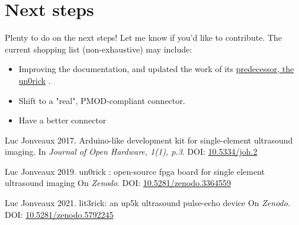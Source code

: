 \documentclass{article}
\begin{document}
 \section{Next steps}

Plenty to do on the next steps! Let me know if you'd like to contribute. The current shopping list (non-exhaustive) may include:

\begin{itemize}
\item Improving the documentation, and updated the work of its \href{https://github.com/kelu124/un0rick}{predecessor, the un0rick} \cite{un0rick}.
\item Shift to a "real", PMOD-compliant connector.
\item Have a better connector
\end{itemize}


  


\begin{thebibliography}{1}

  Luc Jonveaux 2017.
  \newblock  Arduino-like development kit for single-element ultrasound imaging. 
  \newblock In {\em  Journal of Open Hardware, 1(1), p.3}. DOI: \href{http://doi.org/10.5334/joh.2}{10.5334/joh.2}
  
  Luc Jonveaux 2019.
  \newblock  un0rick : open-source fpga board for single element ultrasound imaging
  \newblock On {\em  Zenodo}. DOI: \href{http://doi.org/10.5281/zenodo.3364559}{10.5281/zenodo.3364559}
  
  Luc Jonveaux 2021.
  \newblock lit3rick: an up5k ultrasound pulse-echo device %
  \newblock On {\em  Zenodo}. DOI: \href{http://doi.org/10.5281/zenodo.5792245}{10.5281/zenodo.5792245}
  
\end{thebibliography}
\end{document}
